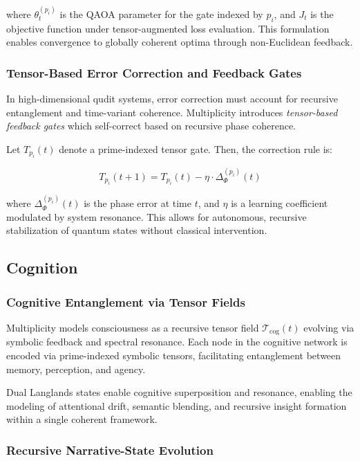 \documentclass{article}
\theoremstyle{plain}
\begin{document}
where \( \theta_t^{(p_i)} \) is the QAOA parameter for the gate indexed by \( p_i \), and \( J_t \) is the objective function under tensor-augmented loss evaluation. This formulation enables convergence to globally coherent optima through non-Euclidean feedback.

\subsubsection{Tensor-Based Error Correction and Feedback Gates}

In high-dimensional qudit systems, error correction must account for recursive entanglement and time-variant coherence. Multiplicity introduces \textit{tensor-based feedback gates} which self-correct based on recursive phase coherence.

Let \( T_{p_i}(t) \) denote a prime-indexed tensor gate. Then, the correction rule is:

\[
T_{p_i}(t+1) = T_{p_i}(t) - \eta \cdot \Delta_\Phi^{(p_i)}(t)
\]

where \( \Delta_\Phi^{(p_i)}(t) \) is the phase error at time \( t \), and \( \eta \) is a learning coefficient modulated by system resonance. This allows for autonomous, recursive stabilization of quantum states without classical intervention.

\subsection{Cognition}

\subsubsection{Cognitive Entanglement via Tensor Fields}

Multiplicity models consciousness as a recursive tensor field \( \mathcal{T}_{\text{cog}}(t) \) evolving via symbolic feedback and spectral resonance. Each node in the cognitive network is encoded via prime-indexed symbolic tensors, facilitating entanglement between memory, perception, and agency.

Dual Langlands states enable cognitive superposition and resonance, enabling the modeling of attentional drift, semantic blending, and recursive insight formation within a single coherent framework.

\subsubsection{Recursive Narrative-State Evolution}
\end{document}
